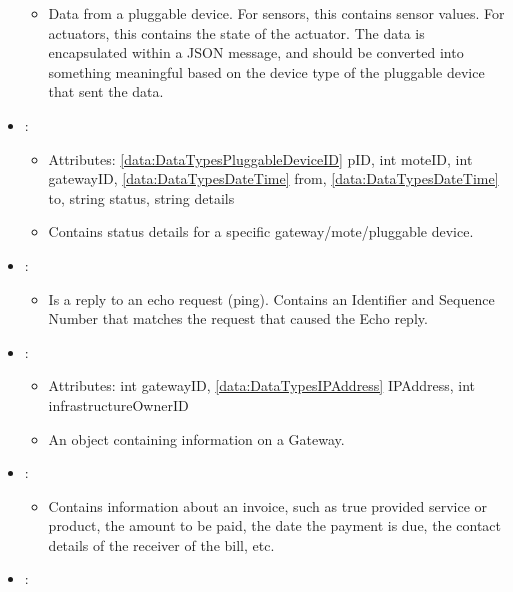 \begin{itemize}[nolistsep,noitemsep]
\begin{itemize}[noitemsep,nolistsep]
\item[] Data from a pluggable device. For sensors, this contains sensor values. For actuators, this contains the state of the actuator. The data is encapsulated within a JSON message, and should be converted into something meaningful based on the device type of the pluggable device that sent the data.
\end{itemize}
\item {}: 
\begin{itemize}[noitemsep,nolistsep]
\item[] Attributes: \ref{data:DataTypesPluggableDeviceID} pID, int moteID, int gatewayID, \ref{data:DataTypesDateTime} from, \ref{data:DataTypesDateTime} to, string status, string details
\item[] Contains status details for a specific gateway/mote/pluggable device.
\end{itemize}
\item {}: 
\begin{itemize}[noitemsep,nolistsep]

\item[] Is a reply to an echo request (ping). Contains an Identifier and Sequence Number that matches the request that caused the Echo reply.
\end{itemize}
\item {}: 
\begin{itemize}[noitemsep,nolistsep]
\item[] Attributes: int gatewayID, \ref{data:DataTypesIPAddress} IPAddress, int infrastructureOwnerID
\item[] An object containing information on a Gateway.
\end{itemize}
\item {}: 
\begin{itemize}[noitemsep,nolistsep]

\item[] Contains information about an invoice, such as true provided service or product, the amount to be paid, the date the payment is due, the contact details of the receiver of the bill, etc.
\end{itemize}
\item {}: 
\begin{itemize}


\end{itemize}
\end{itemize}
